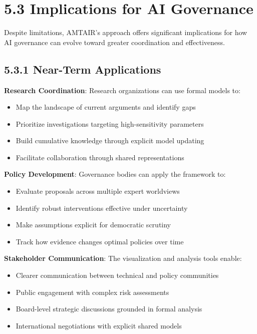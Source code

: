 \documentclass[
  11pt,
  letterpaper,
]{book}
\providecommand{\tightlist}{%
  \setlength{\itemsep}{0pt}\setlength{\parskip}{0pt}}
\begin{document}
\section{5.3 Implications for AI
Governance}\label{sec-governance-implications}

Despite limitations, AMTAIR's approach offers significant implications
for how AI governance can evolve toward greater coordination and
effectiveness.

\subsection{5.3.1 Near-Term
Applications}\label{sec-near-term-applications}

\textbf{Research Coordination}: Research organizations can use formal
models to:

\begin{itemize}
\tightlist
\item
  Map the landscape of current arguments and identify gaps
\item
  Prioritize investigations targeting high-sensitivity parameters
\item
  Build cumulative knowledge through explicit model updating
\item
  Facilitate collaboration through shared representations
\end{itemize}

\textbf{Policy Development}: Governance bodies can apply the framework
to:

\begin{itemize}
\tightlist
\item
  Evaluate proposals across multiple expert worldviews
\item
  Identify robust interventions effective under uncertainty
\item
  Make assumptions explicit for democratic scrutiny
\item
  Track how evidence changes optimal policies over time
\end{itemize}

\textbf{Stakeholder Communication}: The visualization and analysis tools
enable:

\begin{itemize}
\tightlist
\item
  Clearer communication between technical and policy communities
\item
  Public engagement with complex risk assessments
\item
  Board-level strategic discussions grounded in formal analysis
\item
  International negotiations with explicit shared models
\end{itemize}
\end{document}
